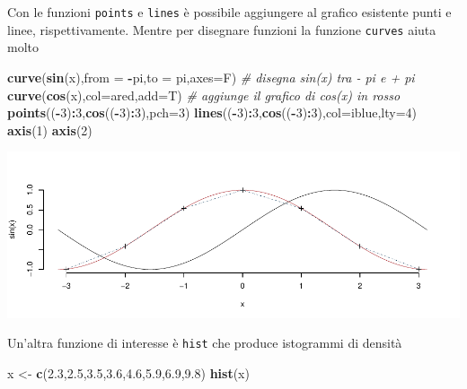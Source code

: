 \documentclass[
  11pt,
]{book}
\newenvironment{Shaded}{\begin{snugshade}}{\end{snugshade}}
\newcommand{\AttributeTok}[1]{\textcolor[rgb]{0.13,0.29,0.53}{#1}}
\newcommand{\CommentTok}[1]{\textcolor[rgb]{0.56,0.35,0.01}{\textit{#1}}}
\newcommand{\DecValTok}[1]{\textcolor[rgb]{0.00,0.00,0.81}{#1}}
\newcommand{\FloatTok}[1]{\textcolor[rgb]{0.00,0.00,0.81}{#1}}
\newcommand{\FunctionTok}[1]{\textcolor[rgb]{0.13,0.29,0.53}{\textbf{#1}}}
\newcommand{\NormalTok}[1]{#1}
\newcommand{\OtherTok}[1]{\textcolor[rgb]{0.56,0.35,0.01}{#1}}
\newcommand{\SpecialCharTok}[1]{\textcolor[rgb]{0.81,0.36,0.00}{\textbf{#1}}}
\theoremstyle{mytheoremstyle}
\theoremstyle{mydefstyle}
\begin{document}
Con le funzioni \texttt{points} e \texttt{lines} è possibile aggiungere al grafico esistente
punti e linee, rispettivamente. Mentre per disegnare funzioni la funzione \texttt{curves}
aiuta molto

\begin{Shaded}
\begin{Highlighting}[]
\FunctionTok{curve}\NormalTok{(}\FunctionTok{sin}\NormalTok{(x),}\AttributeTok{from =} \SpecialCharTok{{-}}\NormalTok{pi,}\AttributeTok{to =}\NormalTok{ pi,}\AttributeTok{axes=}\NormalTok{F) }\CommentTok{\# disegna sin(x) tra {-} pi e + pi }
\FunctionTok{curve}\NormalTok{(}\FunctionTok{cos}\NormalTok{(x),}\AttributeTok{col=}\NormalTok{ared,}\AttributeTok{add=}\NormalTok{T)           }\CommentTok{\# aggiunge il grafico di cos(x) in rosso}
\FunctionTok{points}\NormalTok{((}\SpecialCharTok{{-}}\DecValTok{3}\NormalTok{)}\SpecialCharTok{:}\DecValTok{3}\NormalTok{,}\FunctionTok{cos}\NormalTok{((}\SpecialCharTok{{-}}\DecValTok{3}\NormalTok{)}\SpecialCharTok{:}\DecValTok{3}\NormalTok{),}\AttributeTok{pch=}\DecValTok{3}\NormalTok{)}
\FunctionTok{lines}\NormalTok{((}\SpecialCharTok{{-}}\DecValTok{3}\NormalTok{)}\SpecialCharTok{:}\DecValTok{3}\NormalTok{,}\FunctionTok{cos}\NormalTok{((}\SpecialCharTok{{-}}\DecValTok{3}\NormalTok{)}\SpecialCharTok{:}\DecValTok{3}\NormalTok{),}\AttributeTok{col=}\NormalTok{iblue,}\AttributeTok{lty=}\DecValTok{4}\NormalTok{)}
\FunctionTok{axis}\NormalTok{(}\DecValTok{1}\NormalTok{)}
\FunctionTok{axis}\NormalTok{(}\DecValTok{2}\NormalTok{)}
\end{Highlighting}
\end{Shaded}

\begin{center}\includegraphics{Appunti_di_Statistica_2025_files/figure-latex/24-Libro-26,-1} \end{center}

Un'altra funzione di interesse è \texttt{hist} che produce istogrammi di densità

\begin{Shaded}
\begin{Highlighting}[]
\NormalTok{x }\OtherTok{\textless{}{-}} \FunctionTok{c}\NormalTok{(}\FloatTok{2.3}\NormalTok{,}\FloatTok{2.5}\NormalTok{,}\FloatTok{3.5}\NormalTok{,}\FloatTok{3.6}\NormalTok{,}\FloatTok{4.6}\NormalTok{,}\FloatTok{5.9}\NormalTok{,}\FloatTok{6.9}\NormalTok{,}\FloatTok{9.8}\NormalTok{)}
\FunctionTok{hist}\NormalTok{(x)}
\end{Highlighting}
\end{Shaded}
\end{document}
